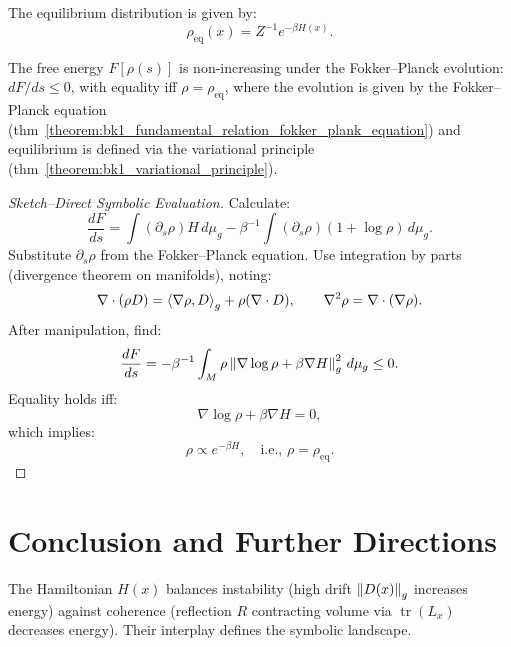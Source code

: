 \begin{corollary}
\label{corollary:bk1_equilibrium_distribution}
The equilibrium distribution is given by:
\[
\rho_{\text{eq}}(x) = Z^{-1} e^{-\beta H(x)}.
\]
\end{corollary}

\begin{theorem}
\label{theorem:bk1_h_theorem_for_symbolic_evolution}
The free energy $F[\rho(s)]$ is non-increasing under the Fokker–Planck evolution: $dF/ds \leq 0$, with equality iff $\rho = \rho_{\text{eq}}$, where the evolution is given by the Fokker–Planck equation (thm~\ref{theorem:bk1_fundamental_relation_fokker_plank_equation}) and equilibrium is defined via the variational principle (thm~\ref{theorem:bk1_variational_principle}).

\begin{proof}[Sketch–Direct Symbolic Evaluation]
\label{proof:bk1_sketch_direct_evaluation}
Calculate:
\[
\frac{dF}{ds} = \int (\partial_s \rho) H \, d\mu_g - \beta^{-1} \int (\partial_s \rho) (1 + \log \rho) \, d\mu_g.
\]
Substitute $\partial_s \rho$ from the Fokker–Planck equation. Use integration by parts (divergence theorem on manifolds), noting:
\[
\nabla \cdot (\rho D) = \left\langle \nabla \rho, D \right\rangle_g + \rho (\nabla \cdot D), \qquad
\nabla^2 \rho = \nabla \cdot (\nabla \rho).
\]
After manipulation, find:
\[
\frac{dF}{ds} = -\beta^{-1} \int_M \rho \left\|\nabla \log \rho + \beta \nabla H\right\|_g^2 \, d\mu_g \le 0.
\]
Equality holds iff:
\[
\nabla \log \rho + \beta \nabla H = 0,
\]
which implies:
\[
\rho \propto e^{-\beta H}, \quad \text{i.e., } \rho = \rho_{\text{eq}}.
\]
\end{proof}
\end{theorem}

\section{Conclusion and Further Directions}
\label{sec:bk1_conclusion_and_further_directions}

\begin{remark}
The Hamiltonian $H(x)$ balances instability (high drift $\left\|D(x)\right\|_g$ increases energy) against coherence (reflection $R$ contracting volume via $\operatorname{tr}(L_x)$ decreases energy). Their interplay defines the symbolic landscape.
\end{remark}

